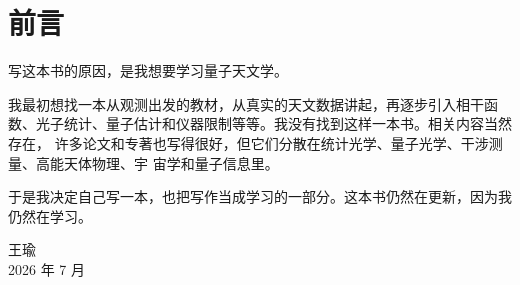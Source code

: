 \chapter*{前言}

写这本书的原因，是我想要学习量子天文学。

我最初想找一本从观测出发的教材，从真实的天文数据讲起，再逐步引入相干函
数、光子统计、量子估计和仪器限制等等。我没有找到这样一本书。相关内容当然存在，
许多论文和专著也写得很好，但它们分散在统计光学、量子光学、干涉测量、高能天体物理、宇
宙学和量子信息里。

于是我决定自己写一本，也把写作当成学习的一部分。这本书仍然在更新，因为我仍然在学习。

\begin{flushright}
王瑜\\
2026 年 7 月
\end{flushright}
